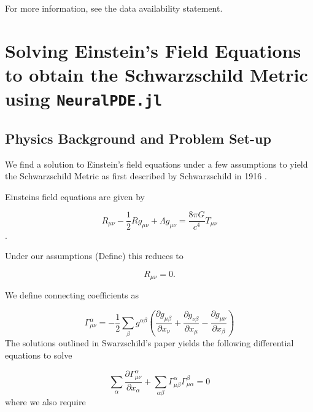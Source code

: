 \documentclass{CUP-JNL-DTM}%
\theoremstyle{definition}
\numberwithin{equation}{section}
\begin{document}
For more information, see the data availability statement. 


\section{Solving Einstein's Field Equations to obtain the Schwarzschild Metric using \texttt{NeuralPDE.jl}}

\subsection{Physics Background and Problem Set-up}

We find a solution to Einstein's field equations under a few assumptions to yield the Schwarzschild Metric as first described by Schwarzschild in 1916 \cite{schwarzschildGravitationalFieldMass1999}. 

Einsteins field equations are given by 

\begin{equation}
    R_{\mu\nu} - \frac{1}{2}R g_{\mu\nu} + \Lambda g_{\mu\nu} = \frac{8 \pi G}{c^4}T_{\mu\nu}
    \label{eqn:EFE}
\end{equation}. 

Under our assumptions (Define) this reduces to 

\begin{equation}
    R_{\mu\nu} = 0. 
\end{equation}

We define connecting coefficients as 

\begin{equation}
    \Gamma^{\alpha}_{\mu\nu} = -\frac{1}{2}\sum_{\beta}g^{\alpha\beta}\left(\frac{\partial g_{\mu\beta}}{\partial x_{\nu}} + \frac{\partial g_{\nu\beta}}{\partial x_{\mu}} - \frac{\partial g_{\mu\nu}}{\partial x_{\beta}}\right)
    \label{eqn:ccs}
\end{equation}
The solutions outlined in Swarzschild's paper yields the following differential equations to solve

\begin{equation}
    \sum_{\alpha} \frac{\partial \Gamma^{\alpha}_{\mu\nu}}{\partial x_{\alpha}} + \sum_{\alpha\beta} \Gamma^{\alpha}_{\mu\beta} \Gamma^{\beta}_{\mu\alpha} = 0
\end{equation}
where we also require 
\end{document}
